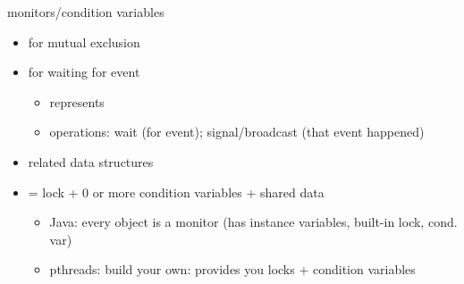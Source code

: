\usetikzlibrary{arrows.meta,calc,chains,fit,matrix}

\begin{frame}{monitors/condition variables}
\begin{itemize}
\item {} for mutual exclusion
\item {} for waiting for event
    \begin{itemize}
    \item represents \textbf{}
    \item operations: wait (for event); signal/broadcast (that event happened)
    \end{itemize}
\item related data structures
\vspace{.5cm}
\item {} = lock + 0 or more condition variables + shared data
    \begin{itemize}
    \item Java: every object is a monitor (has instance variables, built-in lock, cond. var)
    \item pthreads: build your own: provides you locks + condition variables
    \end{itemize}
\end{itemize}
\end{frame}

